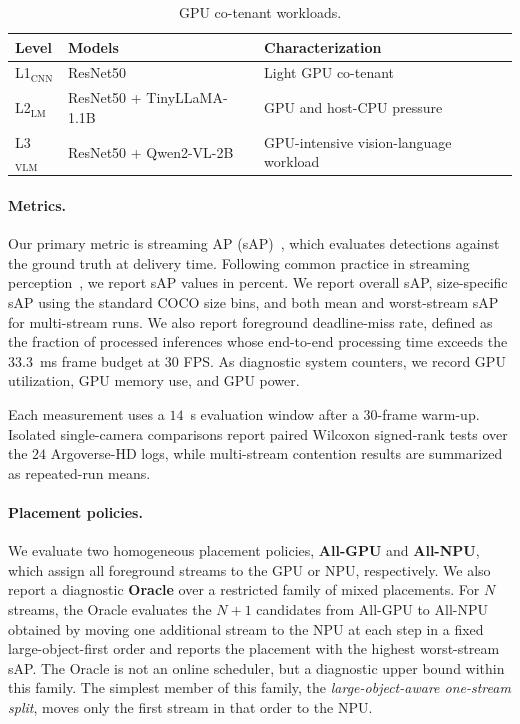 \documentclass[runningheads]{llncs}
\newcommand{\Lcnn}{L1$_{\text{CNN}}$}
\newcommand{\Llm}{L2$_{\text{LM}}$}
\newcommand{\Lvlm}{L3$_{\text{VLM}}$}
\begin{document}
\begin{table}[tbp]
\centering
\caption{GPU co-tenant workloads.}
\label{tab:cotenants}
\footnotesize
\begin{tabular}{l l l}
\toprule
Level & Models & Characterization \\
\midrule
\Lcnn{} & ResNet50 & Light GPU co-tenant \\
\Llm{} & ResNet50 + TinyLLaMA-1.1B & GPU and host-CPU pressure \\
\Lvlm{} & ResNet50 + Qwen2-VL-2B & GPU-intensive vision-language workload \\
\bottomrule
\end{tabular}
\end{table}

\paragraph{\textbf{Metrics.}}
Our primary metric is streaming AP (sAP)~\cite{streaming-perception}, which evaluates detections against the ground truth at delivery time. Following common practice in streaming perception~\cite{streaming-perception,streamyolo}, we report sAP values in percent. We report overall sAP, size-specific sAP using the standard COCO size bins, and both mean and worst-stream sAP for multi-stream runs.
%
We also report foreground deadline-miss rate, defined as the fraction of processed inferences whose end-to-end processing time exceeds the $33.3$~ms frame budget at 30 FPS. As diagnostic system counters, we record GPU utilization, GPU memory use, and GPU power.

Each measurement uses a $14$~s evaluation window after a $30$-frame warm-up. Isolated single-camera comparisons report paired Wilcoxon signed-rank tests over the $24$ Argoverse-HD logs, while multi-stream contention results are summarized as repeated-run means.


\paragraph{\textbf{Placement policies.}}
We evaluate two homogeneous placement policies, \textbf{All-GPU} and \textbf{All-NPU}, which assign all foreground streams to the GPU or NPU, respectively. We also report a diagnostic \textbf{Oracle} over a restricted family of mixed placements. For $N$ streams, the Oracle evaluates the $N{+}1$ candidates from All-GPU to All-NPU obtained by moving one additional stream to the NPU at each step in a fixed large-object-first order and reports the placement with the highest worst-stream sAP. The Oracle is not an online scheduler, but a diagnostic upper bound within this family. The simplest member of this family, the \emph{large-object-aware one-stream split}, moves only the first stream in that order to the NPU.
\end{document}
